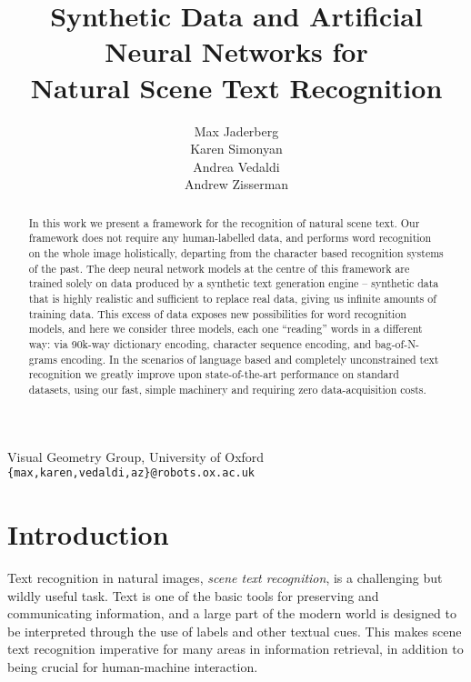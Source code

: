 \documentclass{article} \usepackage{nips14submit_e,times}
\begin{document}
\title{Synthetic Data and Artificial Neural Networks for\\ Natural Scene Text Recognition}
\author{
Max Jaderberg \\
\And
Karen Simonyan \\
\And
Andrea Vedaldi \\
\And
Andrew Zisserman
}
\maketitle
 \vspace{-3.5em}
 \begin{center}
 Visual Geometry Group, University of Oxford\\
 \texttt{\{max,karen,vedaldi,az\}@robots.ox.ac.uk}  
 \end{center}
 \vspace{1em}
\begin{abstract}
In this work we present a framework for the recognition of natural scene text. Our framework does not require any human-labelled data, and performs word recognition on the whole image holistically, departing from the character based recognition systems of the past. The deep neural network models at the centre of this framework are trained solely on data produced by a synthetic text generation engine -- synthetic data that is highly realistic and sufficient to replace real data, giving us infinite amounts of training data. This excess of data exposes new possibilities for word recognition models, and here we consider three models, each one ``reading'' words in a different way: via 90k-way dictionary encoding, character sequence encoding, and bag-of-N-grams encoding. In the scenarios of language based and completely unconstrained text recognition we greatly improve upon state-of-the-art performance on standard datasets, using our fast, simple machinery and requiring zero data-acquisition costs.

\end{abstract}

\section{Introduction}
Text recognition in natural images, \emph{scene text recognition}, is a challenging but wildly useful task. Text is one of the basic tools for preserving and communicating information, and a large part of the modern world is designed to be interpreted through the use of labels and other textual cues. This makes scene text recognition imperative for many areas in information retrieval, in addition to being crucial for human-machine interaction.
\end{document}
